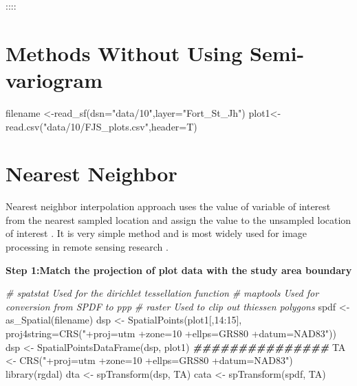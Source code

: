 \documentclass[
]{book}
\newenvironment{Shaded}{\begin{snugshade}}{\end{snugshade}}
\newcommand{\AttributeTok}[1]{\textcolor[rgb]{0.77,0.63,0.00}{#1}}
\newcommand{\CommentTok}[1]{\textcolor[rgb]{0.56,0.35,0.01}{\textit{#1}}}
\newcommand{\DecValTok}[1]{\textcolor[rgb]{0.00,0.00,0.81}{#1}}
\newcommand{\DocumentationTok}[1]{\textcolor[rgb]{0.56,0.35,0.01}{\textbf{\textit{#1}}}}
\newcommand{\FunctionTok}[1]{\textcolor[rgb]{0.00,0.00,0.00}{#1}}
\newcommand{\NormalTok}[1]{#1}
\newcommand{\OtherTok}[1]{\textcolor[rgb]{0.56,0.35,0.01}{#1}}
\newcommand{\SpecialCharTok}[1]{\textcolor[rgb]{0.00,0.00,0.00}{#1}}
\newcommand{\StringTok}[1]{\textcolor[rgb]{0.31,0.60,0.02}{#1}}
\begin{document}
::::

\hypertarget{methods-without-using-semi-variogram}{%
\section{Methods Without Using Semi-variogram}\label{methods-without-using-semi-variogram}}

\begin{Shaded}
\begin{Highlighting}[]
\NormalTok{filename }\OtherTok{\textless{}{-}}\FunctionTok{read\_sf}\NormalTok{(}\AttributeTok{dsn=}\StringTok{"data/10"}\NormalTok{,}\AttributeTok{layer=}\StringTok{"Fort\_St\_Jh"}\NormalTok{)}
\NormalTok{plot1}\OtherTok{\textless{}{-}} \FunctionTok{read.csv}\NormalTok{(}\StringTok{"data/10/FJS\_plots.csv"}\NormalTok{,}\AttributeTok{header=}\NormalTok{T)}
\end{Highlighting}
\end{Shaded}

\hypertarget{nearest-neighbor}{%
\section{Nearest Neighbor}\label{nearest-neighbor}}

Nearest neighbor interpolation approach uses the value of variable of interest from the nearest sampled location and assign the value to the unsampled location of interest \citep{titus_comparison_2013}. It is very simple method and is most widely used for image processing in remote sensing research \citep{titus_comparison_2013}.

\textbf{Step 1:Match the projection of plot data with the study area boundary}

\begin{Shaded}
\begin{Highlighting}[]
\CommentTok{\# spatstat Used for the dirichlet tessellation function}
\CommentTok{\# maptools Used for conversion from SPDF to ppp}
\CommentTok{\# raster Used to clip out thiessen polygons}
\NormalTok{spdf }\OtherTok{\textless{}{-}} \FunctionTok{as\_Spatial}\NormalTok{(filename)}
\NormalTok{dsp }\OtherTok{\textless{}{-}} \FunctionTok{SpatialPoints}\NormalTok{(plot1[,}\DecValTok{14}\SpecialCharTok{:}\DecValTok{15}\NormalTok{], }\AttributeTok{proj4string=}\FunctionTok{CRS}\NormalTok{(}\StringTok{"+proj=utm +zone=10 +ellps=GRS80 +datum=NAD83"}\NormalTok{))}
\NormalTok{dsp }\OtherTok{\textless{}{-}} \FunctionTok{SpatialPointsDataFrame}\NormalTok{(dsp, plot1)}
\DocumentationTok{\#\#\#\#\#\#\#\#\#\#\#\#\#\#\#}
\NormalTok{TA }\OtherTok{\textless{}{-}} \FunctionTok{CRS}\NormalTok{(}\StringTok{"+proj=utm +zone=10 +ellps=GRS80 +datum=NAD83"}\NormalTok{)}
\FunctionTok{library}\NormalTok{(rgdal)}
\NormalTok{dta }\OtherTok{\textless{}{-}} \FunctionTok{spTransform}\NormalTok{(dsp, TA)}
\NormalTok{cata }\OtherTok{\textless{}{-}} \FunctionTok{spTransform}\NormalTok{(spdf, TA)}
\end{Highlighting}
\end{Shaded}
\end{document}
